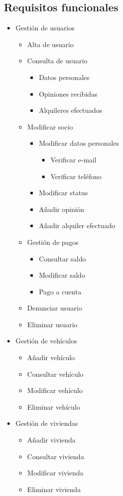 \documentclass[11pt,spanish]{article} %
\begin{document}
\subsection{Requisitos funcionales}
\begin{itemize}
	\item Gestión de usuarios
	
	\begin{itemize}
		\item Alta de usuario
		\item Consulta de usuario
		\begin{itemize}
			\item Datos personales
			\item Opiniones recibidas
			\item Alquileres efectuados
		\end{itemize}
		\item Modificar socio
		\begin{itemize}
			\item Modificar datos personales
			\begin{itemize}
				\item Verificar e-mail
				\item Verificar teléfono
			\end{itemize}
			\item Modificar status
			\item Añadir opinión
			\item Añadir alquiler efectuado
		\end{itemize}
		\item Gestión de pagos
		\begin{itemize}
			\item Consultar saldo
			\item Modificar saldo
			\item Pago a cuenta
		\end{itemize}
		\item Denunciar usuario
		\item Eliminar usuario
	\end{itemize}
	
	\item Gestión de vehículos
	\begin{itemize}
		\item Añadir vehículo
		\item Consultar vehículo
		\item Modificar vehículo
		\item Eliminar vehículo
	\end{itemize}
	\item Gestión de viviendas
	\begin{itemize}
		\item Añadir vivienda
		\item Consultar vivienda
		\item Modificar vivienda
		\item Eliminar vivienda
	\end{itemize}
	

\end{itemize}
\end{document}
